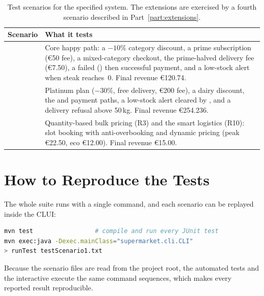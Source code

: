 \begin{table}[H]
\centering
\small
\begin{tabularx}{\linewidth}{p{3cm} Y}
\toprule
\textbf{Scenario} & \textbf{What it tests} \\
\midrule
{} & Core happy path: a $-10\%$ category discount, a prime
subscription (\euro{}50 fee), a mixed-category checkout, the prime-halved delivery
fee (\euro{}7.50), a failed () then successful payment,
and a low-stock alert when steak reaches~0. Final revenue \euro{}120.74. \\
 & Platinum plan ($-30\%$, free delivery, \euro{}200 fee),
a dairy discount, the  and  payment paths, a
low-stock alert cleared by , and a delivery refusal above 50\,kg.
Final revenue \euro{}254.236. \\
 & Quantity-based bulk pricing (R3) and the smart
logistics (R10): slot booking with anti-overbooking and dynamic pricing
(peak \euro{}22.50, eco \euro{}12.00). Final revenue \euro{}15.00. \\
\bottomrule
\end{tabularx}
\caption{Test scenarios for the specified system. The extensions are exercised by
a fourth scenario described in Part~\ref{part:extensions}.}
\label{tab:scenarios}
\end{table}

\section{How to Reproduce the Tests}
The whole suite runs with a single command, and each scenario can be replayed
inside the CLUI:
\begin{lstlisting}[language=bash]
mvn test                 # compile and run every JUnit test
mvn exec:java -Dexec.mainClass="supermarket.cli.CLI"
> runTest testScenario1.txt
\end{lstlisting}
Because the scenario files are read from the project root, the automated tests
and the interactive  execute the same command sequences, which
makes every reported result reproducible.
